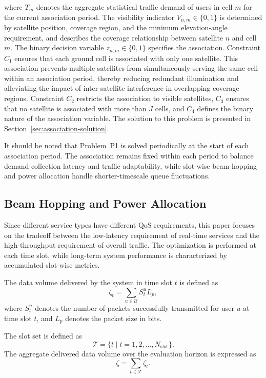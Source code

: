 \documentclass[journal]{IEEEtran}
\begin{document}
where $T_m$ denotes the aggregate statistical traffic demand of users in cell $m$ for the current association period. The visibility indicator $V_{n,m}\in\{0,1\}$ is determined by satellite position, coverage region, and the minimum elevation-angle requirement, and describes the coverage relationship between satellite $n$ and cell $m$. The binary decision variable $z_{n,m}\in\{0,1\}$ specifies the association. Constraint $C_1$ ensures that each ground cell is associated with only one satellite. This association prevents multiple satellites from simultaneously serving the same cell within an association period, thereby reducing redundant illumination and alleviating the impact of inter-satellite interference in overlapping coverage regions. Constraint $C_2$ restricts the association to visible satellites, $C_3$ ensures that no satellite is associated with more than $J$ cells, and $C_4$ defines the binary nature of the association variable. The solution to this problem is presented in Section~\ref{sec:association-solution}.


It should be noted that Problem~\hyperref[prob:p1]{P1} is solved periodically at the start of each association period. The association remains fixed within each period to balance demand-collection latency and traffic adaptability, while slot-wise beam hopping and power allocation handle shorter-timescale queue fluctuations.

\subsection{Beam Hopping and Power Allocation}
\label{subsec:beam-hopping-formulation}
Since different service types have different QoS requirements, this paper focuses on the tradeoff between the low-latency requirement of real-time services and the high-throughput requirement of overall traffic. The optimization is performed at each time slot, while long-term system performance is characterized by accumulated slot-wise metrics.

The data volume delivered by the system in time slot $t$ is defined as
\begin{equation}
\zeta_t=
\sum_{u\in\mathcal{U}}S_t^uL_p,
\end{equation}
where $S_t^u$ denotes the number of packets successfully transmitted for user $u$ at time slot $t$, and $L_p$ denotes the packet size in bits.

The slot set is defined as 
\begin{equation}
\mathcal{T}=\{t\mid t=1,2,\ldots,N_{\mathrm{slot}}\}.
\end{equation}
The aggregate delivered data volume over the evaluation horizon is expressed as
\begin{equation}
\zeta=
\sum_{t\in\mathcal{T}}\zeta_t.
\end{equation}
\end{document}
